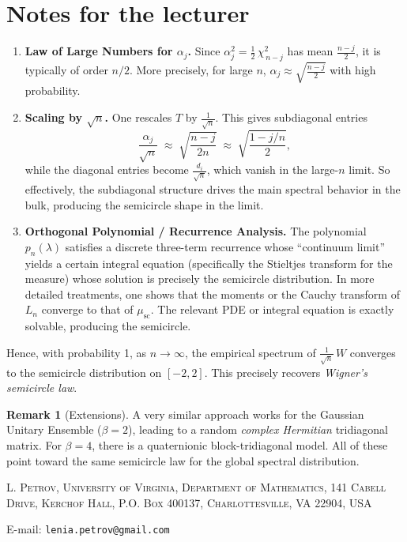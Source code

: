 \documentclass[letterpaper,11pt,oneside,reqno]{article}
\numberwithin{equation}{section}
\theoremstyle{definition}
\newtheorem{remark}[proposition]{Remark}
\newenvironment{lnotes}{\section*{Notes for the lecturer}}{}
\begin{document}
\begin{lnotes}
\begin{enumerate}[1.]
\item \textbf{Law of Large Numbers for \(\alpha_j\).}
   Since \(\alpha_j^2 = \tfrac12\,\chi^2_{\,n-j}\) has mean \(\tfrac{n-j}{2}\), it is typically of order \(n/2\).  More precisely, for large \(n\), \(\alpha_j \approx \sqrt{\tfrac{n-j}{2}}\) with high probability.

\item \textbf{Scaling by \(\sqrt{n}\).}
   One rescales \(T\) by \(\tfrac{1}{\sqrt{n}}\).  This gives subdiagonal entries
   \[
     \frac{\alpha_j}{\sqrt{n}}
     \;\approx\;
     \sqrt{\frac{n-j}{2n}}
     \;\approx\;
     \sqrt{\frac{1 - j/n}{2}},
   \]
   while the diagonal entries become \(\tfrac{d_i}{\sqrt{n}}\), which vanish in the large-\(n\) limit.  So effectively, the subdiagonal structure drives the main spectral behavior in the bulk, producing the semicircle shape in the limit.

\item \textbf{Orthogonal Polynomial / Recurrence Analysis.}
   The polynomial \(p_n(\lambda)\) satisfies a discrete three-term recurrence whose ``continuum limit'' yields a certain integral equation (specifically the Stieltjes transform for the measure) whose solution is precisely the semicircle distribution.  In more detailed treatments, one shows that the moments or the Cauchy transform of \(L_n\) converge to that of \(\mu_{\mathrm{sc}}\).  The relevant PDE or integral equation is exactly solvable, producing the semicircle.

\end{enumerate}

Hence, with probability 1, as \(n\to\infty\), the empirical spectrum of \(\tfrac{1}{\sqrt{n}}\,W\) converges to the semicircle distribution on \([-2,2]\).  This precisely recovers \emph{Wigner’s semicircle law}.

\begin{remark}[Extensions]
A very similar approach works for the Gaussian Unitary Ensemble (\(\beta=2\)), leading to a random \emph{complex Hermitian} tridiagonal matrix.  For \(\beta=4\), there is a quaternionic block-tridiagonal model.  All of these point toward the same semicircle law for the global spectral distribution.
\end{remark}


\end{lnotes}







\medskip

\textsc{L. Petrov, University of Virginia, Department of Mathematics, 141 Cabell Drive, Kerchof Hall, P.O. Box 400137, Charlottesville, VA 22904, USA}

E-mail: \texttt{lenia.petrov@gmail.com}
\end{document}

